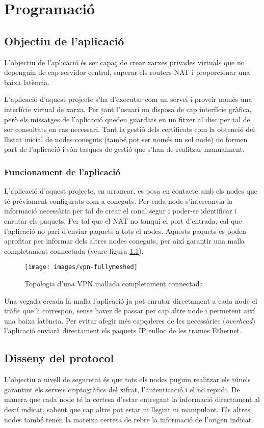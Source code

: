 \chapter{Programació}
\section{Objectiu de l'aplicació}
L'objectiu de l'aplicació és ser capaç de crear xarxes privades virtuals que no depenguin de cap servidor central, superar els routers NAT i proporcionar una baixa latència.

L'aplicació d'aquest projecte s'ha d'executar com un servei i proveir només una interfície virtual de xarxa. Per tant l'usuari no disposa de cap interfície gràfica, però els missatges de l'aplicació queden guardats en un fitxer al disc per tal de ser consultats en cas necessari.
Tant la gestió dels certificats com la obtenció del llistat inicial de nodes coneguts (també pot ser només un sol node) no formen part de l'aplicació i són tasques de gestió que s'han de realitzar manualment.

\subsection{Funcionament de l'aplicació}
L'aplicació d'aquest projecte, en arrancar, es posa en contacte amb els nodes que té prèviament configurats com a coneguts. Per cada node s'intercanvia la informació necessària per tal de crear el canal segur i poder-se identificar i enrutar els paquets. Per tal que el NAT no tanqui el port d'entrada, cal que l'aplicació no pari d'enviar paquets a tots el nodes. Aquests paquets es poden aprofitar per informar dels altres nodes coneguts, per així garantir una malla completament connectada (veure figura \ref{F:vpn-fullymeshed}).
\begin{figure}[htb]
\centering
\texttt{[image: images/vpn-fullymeshed]}
\caption{Topologia d'una VPN mallada completament connectada}
\label{F:vpn-fullymeshed}
\end{figure}

Una vegada creada la malla l'aplicació ja pot enrutar directament a cada node el tràfic que li correspon, sense haver de passar per cap altre node i permetent així una baixa latència. Per evitar afegir més capçaleres de les necessàries (\emph{overhead}) l'aplicació enviarà directament els paquets IP enlloc de les trames Ethernet.

\section{Disseny del protocol}
L'objectiu a nivell de seguretat és que tots els nodes puguin realitzar els túnels garantint els serveis criptogràfics del xifrat, l'autenticació i el no repudi. De manera que cada node té la certesa d'estar entregant la informació directament al destí indicat, sabent que cap altre pot estar ni llegint ni manipulant. Els altres nodes també tenen la mateixa certesa de rebre la informació de l'origen indicat.


